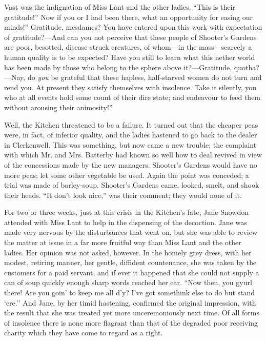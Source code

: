 Vast was the indignation of Miss Lant and the other ladies. ``This is
their gratitude!'' Now if you or I had been there, what an opportunity
for easing our minds!'' Gratitude, mesdames? You have entered upon this
work with expectation of gratitude?---And can you not perceive that
these people of Shooter's Gardens are poor, besotted, disease-struck
creatures, of whom---in the mass---scarcely a human quality is to be
expected? Have you still to learn what this nether world has been made
by those who belong to the sphere above it?---Gratitude, quotha?---Nay,
do \emph{you} be grateful that these hapless, half-starved women do not
turn and rend you. At present they satisfy themselves with insolence.
Take it silently, you who at all events hold some count of their dire
state; and endeavour to feed them without arousing their animosity!''

{\protect\hypertarget{12}{}{}}Well, the Kitchen threatened to be a
failure. It turned out that the cheaper peas were, in fact, of inferior
quality, and the ladies hastened to go back to the dealer in
Clerkenwell. This was something, but now came a new trouble; the
complaint with which Mr. and Mrs. Batterby had known so well how to deal
revived in view of the concessions made by the new managers. Shooter's
Gardens would have no more peas; let some other vegetable be used. Again
the point was conceded; a trial was made of barley-soup. Shooter's
Gardens came, looked, smelt, and shook their heads. ``It don't look
nice,'' was their comment; they would none of it.

For two or three weeks, just at this crisis in the Kitchen's fate, Jane
Snowdon attended with Miss Lant to help in the dispensing of the
decoction. Jane was made very nervous by the disturbances that went on,
but she was able to review the matter at issue in a far more fruitful
way than Miss Lant and the other ladies. Her opinion was not asked,
however. In the homely grey dress, with her modest, retiring manner, her
gentle, diffident countenance, she was taken by the customers for a
{\protect\hypertarget{13}{}{}}paid servant, and if ever it happened that
she could not supply a can of soup quickly enough sharp words reached
her ear. ``Now then, you gyurl there! Are you goin' to keep me all d'y?
I've got somethink else to do but stand `ere.'' And Jane, by her timid
hastening, confirmed the original impression, with the result that she
was treated yet more unceremoniously next time. Of all forms of
insolence there is none more flagrant than that of the degraded poor
receiving charity which they have come to regard as a right.

